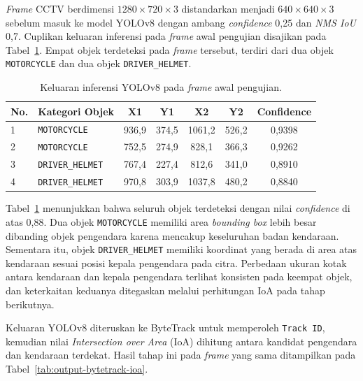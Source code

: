 \textit{Frame} CCTV berdimensi $1280 \times 720 \times 3$ distandarkan menjadi $640 \times 640 \times 3$ sebelum masuk ke model YOLOv8 dengan ambang \textit{confidence} 0,25 dan \textit{NMS IoU} 0,7. Cuplikan keluaran inferensi pada \textit{frame} awal pengujian disajikan pada Tabel~\ref{tab:output-yolo}. Empat objek terdeteksi pada \textit{frame} tersebut, terdiri dari dua objek \texttt{MOTORCYCLE} dan dua objek \texttt{DRIVER\_HELMET}.

\begin{table}[htbp]
\centering
\caption{Keluaran inferensi YOLOv8 pada \textit{frame} awal pengujian.}
\label{tab:output-yolo}
\footnotesize
\setlength{\tabcolsep}{3pt}
\begin{tabular}{p{1.4cm} p{3.2cm} c c c c c}
\toprule
\textbf{No.} & \textbf{Kategori Objek} & \textbf{X1} & \textbf{Y1} & \textbf{X2} & \textbf{Y2} & \textbf{Confidence} \\
\midrule
1 & \texttt{MOTORCYCLE}      & 936{,}9  & 374{,}5 & 1061{,}2 & 526{,}2 & 0{,}9398 \\
2 & \texttt{MOTORCYCLE}      & 752{,}5  & 274{,}9 &  828{,}1 & 366{,}3 & 0{,}9262 \\
3 & \texttt{DRIVER\_HELMET}  & 767{,}4  & 227{,}4 &  812{,}6 & 341{,}0 & 0{,}8910 \\
4 & \texttt{DRIVER\_HELMET}  & 970{,}8  & 303{,}9 & 1037{,}8 & 480{,}2 & 0{,}8840 \\
\bottomrule
\end{tabular}
\end{table}

Tabel~\ref{tab:output-yolo} menunjukkan bahwa seluruh objek terdeteksi dengan nilai \textit{confidence} di atas 0,88. Dua objek \texttt{MOTORCYCLE} memiliki area \textit{bounding box} lebih besar dibanding objek pengendara karena mencakup keseluruhan badan kendaraan. Sementara itu, objek \texttt{DRIVER\_HELMET} memiliki koordinat yang berada di area atas kendaraan sesuai posisi kepala pengendara pada citra. Perbedaan ukuran kotak antara kendaraan dan kepala pengendara terlihat konsisten pada keempat objek, dan keterkaitan keduanya ditegaskan melalui perhitungan IoA pada tahap berikutnya.

Keluaran YOLOv8 diteruskan ke ByteTrack untuk memperoleh \texttt{Track ID}, kemudian nilai \textit{Intersection over Area} (IoA) dihitung antara kandidat pengendara dan kendaraan terdekat. Hasil tahap ini pada \textit{frame} yang sama ditampilkan pada Tabel~\ref{tab:output-bytetrack-ioa}.

